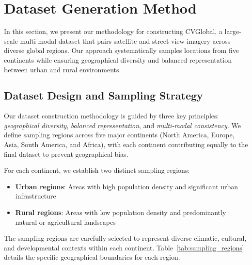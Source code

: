 \section{Dataset Generation Method}
\label{sec:dataset_generation}

In this section, we present our methodology for constructing CVGlobal, a large-scale multi-modal dataset that pairs satellite and street-view imagery across diverse global regions. Our approach systematically samples locations from five continents while ensuring geographical diversity and balanced representation between urban and rural environments.

\subsection{Dataset Design and Sampling Strategy}

Our dataset construction methodology is guided by three key principles: \textit{geographical diversity}, \textit{balanced representation}, and \textit{multi-modal consistency}. We define sampling regions across five major continents (North America, Europe, Asia, South America, and Africa), with each continent contributing equally to the final dataset to prevent geographical bias.

For each continent, we establish two distinct sampling regions:
\begin{itemize}
    \item \textbf{Urban regions}: Areas with high population density and significant urban infrastructure
    \item \textbf{Rural regions}: Areas with low population density and predominantly natural or agricultural landscapes
\end{itemize}

The sampling regions are carefully selected to represent diverse climatic, cultural, and developmental contexts within each continent. Table~\ref{tab:sampling_regions} details the specific geographical boundaries for each region.

